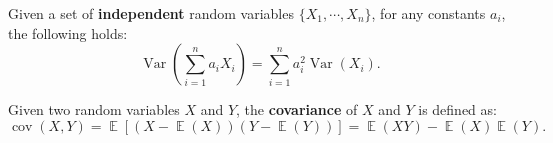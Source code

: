 \documentclass{huhtakm-template-book-v2}
\DeclareMathOperator{\E}{\mathbb{E}}
\DeclareMathOperator{\Var}{Var}
\DeclareMathOperator{\cov}{cov}
\begin{document}
    \begin{lem}
        Given a set of \textbf{independent} random variables $\{X_{1}, \cdots, X_{n}\}$, for any constants $a_{i}$, the following holds:
        \begin{equation*}
            \Var\left(\sum_{i=1}^{n} a_{i} X_{i}\right) = \sum_{i=1}^{n} a_{i}^{2} \Var(X_{i}).
        \end{equation*}
    \end{lem}
    \begin{defn}
        Given two random variables $X$ and $Y$, the \textbf{covariance} of $X$ and $Y$ is defined as:
        \begin{equation*}
            \cov(X, Y) = \E[(X - \E(X))(Y - \E(Y))] = \E(XY) - \E(X)\E(Y).
        \end{equation*}
    \end{defn}
    \newpage
\end{document}
